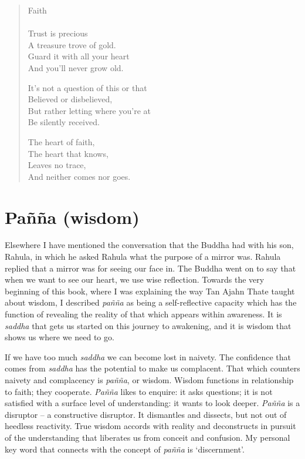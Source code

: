 \begin{quote}
  Faith\\~\\
  
  Trust is precious\\
  A treasure trove of gold.\\
  Guard it with all your heart\\
  And you'll never grow old.
  
  It's not a question of this or that\\
  Believed or disbelieved,\\
  But rather letting where you're at\\
  Be silently received.
  
  The heart of faith,\\
  The heart that knows,\\
  Leaves no trace,\\
  And neither comes nor goes.
\end{quote}

\section{Pañña (wisdom)}

Elsewhere I have mentioned the conversation that the Buddha had with his
son, Rahula, in which he asked Rahula what the purpose of a mirror was.
Rahula replied that a mirror was for seeing our face in. The Buddha went
on to say that when we want to see our heart, we use wise reflection.
Towards the very beginning of this book, where I was explaining the way Tan Ajahn Thate taught about wisdom, I described \emph{pañña} as being a self-reflective capacity which has the
function of revealing the reality of that which appears within
awareness. It is \emph{saddha} that gets us started on this journey to
awakening, and it is wisdom that shows us where we need to go.

If we have too much \emph{saddha} we can become lost in naivety. The
confidence that comes from \emph{saddha} has the potential to make us
complacent. That which counters naivety and complacency is \emph{pañña}, or
wisdom. Wisdom functions in relationship to faith; they cooperate.
\emph{Pañña} likes to enquire: it asks questions; it is not satisfied with a
surface level of understanding: it wants to look deeper. \emph{Pañña} is a
disruptor -- a constructive disruptor. It dismantles and dissects, but
not out of heedless reactivity. True wisdom accords with reality and
deconstructs in pursuit of the understanding that liberates us from
conceit and confusion. My personal key word that connects with the
concept of \emph{pañña} is `discernment'.

